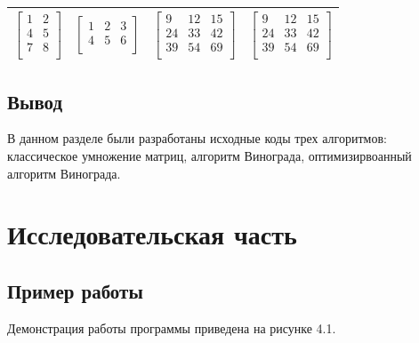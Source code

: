 \documentclass[12pt]{report}
\begin{document}
\begin{table}[h]
\begin{center}
\begin{tabular}{ | c | c | c | c |}
			$\begin{bmatrix} 
				1&2 \\
				4&5 \\ 
				7&8 \\ 
			\end{bmatrix}$ & 
			$\begin{bmatrix} 
				1&2&3 \\
				4&5&6 \\ 
			\end{bmatrix}$ &
			$\begin{bmatrix} 
				9&12&15 \\
				24&33&42 \\ 
				39&54&69 \\ 
			\end{bmatrix} $ &
			$\begin{bmatrix} 
				9&12&15 \\
				24&33&42 \\ 
				39&54&69 \\ 
			\end{bmatrix} $ \\
			\hline
		\end{tabular}
		
	\end{center}
\end{table} 

\newpage

\section{Вывод}
В данном разделе были разработаны исходные коды трех алгоритмов: классическое умножение матриц, алгоритм Винограда, оптимизирвоанный алгоритм Винограда. 

\chapter{Исследовательская часть}

\section{Пример работы}

Демонстрация работы программы приведена на рисунке 4.1.
\end{document}
